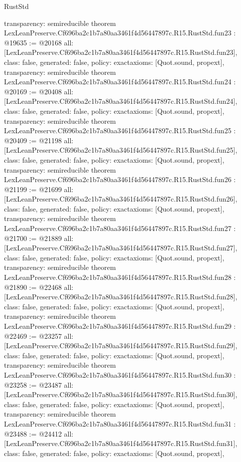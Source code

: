 \begin{lexlean}{RustStd}
\begin{coremodule}
{  transparency: semireducible
}
theorem LexLeanPreserve.Cf696ba2c1b7a80aa3461f4d56447897c.R15.RustStd.fun23 : @19635 := @20168 {
  all: [LexLeanPreserve.Cf696ba2c1b7a80aa3461f4d56447897c.R15.RustStd.fun23],
  class: false,
  generated: false,
  policy: exact{axioms: [Quot.sound, propext]},
  transparency: semireducible
}
theorem LexLeanPreserve.Cf696ba2c1b7a80aa3461f4d56447897c.R15.RustStd.fun24 : @20169 := @20408 {
  all: [LexLeanPreserve.Cf696ba2c1b7a80aa3461f4d56447897c.R15.RustStd.fun24],
  class: false,
  generated: false,
  policy: exact{axioms: [Quot.sound, propext]},
  transparency: semireducible
}
theorem LexLeanPreserve.Cf696ba2c1b7a80aa3461f4d56447897c.R15.RustStd.fun25 : @20409 := @21198 {
  all: [LexLeanPreserve.Cf696ba2c1b7a80aa3461f4d56447897c.R15.RustStd.fun25],
  class: false,
  generated: false,
  policy: exact{axioms: [Quot.sound, propext]},
  transparency: semireducible
}
theorem LexLeanPreserve.Cf696ba2c1b7a80aa3461f4d56447897c.R15.RustStd.fun26 : @21199 := @21699 {
  all: [LexLeanPreserve.Cf696ba2c1b7a80aa3461f4d56447897c.R15.RustStd.fun26],
  class: false,
  generated: false,
  policy: exact{axioms: [Quot.sound, propext]},
  transparency: semireducible
}
theorem LexLeanPreserve.Cf696ba2c1b7a80aa3461f4d56447897c.R15.RustStd.fun27 : @21700 := @21889 {
  all: [LexLeanPreserve.Cf696ba2c1b7a80aa3461f4d56447897c.R15.RustStd.fun27],
  class: false,
  generated: false,
  policy: exact{axioms: [Quot.sound, propext]},
  transparency: semireducible
}
theorem LexLeanPreserve.Cf696ba2c1b7a80aa3461f4d56447897c.R15.RustStd.fun28 : @21890 := @22468 {
  all: [LexLeanPreserve.Cf696ba2c1b7a80aa3461f4d56447897c.R15.RustStd.fun28],
  class: false,
  generated: false,
  policy: exact{axioms: [Quot.sound, propext]},
  transparency: semireducible
}
theorem LexLeanPreserve.Cf696ba2c1b7a80aa3461f4d56447897c.R15.RustStd.fun29 : @22469 := @23257 {
  all: [LexLeanPreserve.Cf696ba2c1b7a80aa3461f4d56447897c.R15.RustStd.fun29],
  class: false,
  generated: false,
  policy: exact{axioms: [Quot.sound, propext]},
  transparency: semireducible
}
theorem LexLeanPreserve.Cf696ba2c1b7a80aa3461f4d56447897c.R15.RustStd.fun30 : @23258 := @23487 {
  all: [LexLeanPreserve.Cf696ba2c1b7a80aa3461f4d56447897c.R15.RustStd.fun30],
  class: false,
  generated: false,
  policy: exact{axioms: [Quot.sound, propext]},
  transparency: semireducible
}
theorem LexLeanPreserve.Cf696ba2c1b7a80aa3461f4d56447897c.R15.RustStd.fun31 : @23488 := @24412 {
  all: [LexLeanPreserve.Cf696ba2c1b7a80aa3461f4d56447897c.R15.RustStd.fun31],
  class: false,
  generated: false,
  policy: exact{axioms: [Quot.sound, propext]},
}
\end{coremodule}
\end{lexlean}
